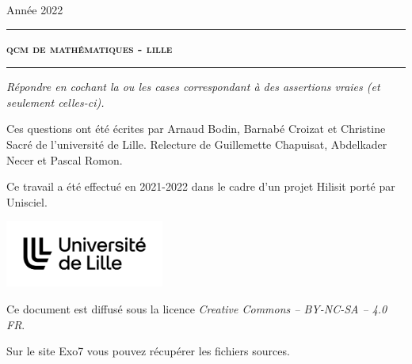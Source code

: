 \documentclass[11pt,a4paper]{article}
\begin{document}
 


\hfill{Année 2022}

\vspace*{0.5ex}
\hrule\vspace*{1.5ex} 
\hfil\textsc{\textbf{\LARGE qcm de mathématiques - lille}}
\vspace*{1.2ex} \hrule 
\vspace*{5ex} 


\vspace{4cm}

\begin{center}
\begin{minipage}{0.8\textwidth}
\center
\textit{Répondre en cochant la ou les cases correspondant à des assertions vraies (et seulement celles-ci).}
\end{minipage}
\end{center}
  
  


\vfill

\begin{center}
\begin{minipage}{0.8\textwidth}
\center
Ces questions ont été écrites par Arnaud Bodin, Barnabé Croizat et Christine Sacré de l'université de Lille. Relecture de Guillemette Chapuisat, Abdelkader Necer et Pascal Romon.
  
  \medskip
  
Ce travail a été effectué en 2021-2022 dans le cadre d'un projet Hilisit porté par Unisciel.
\end{minipage}

  \medskip

\qquad\qquad
\includegraphics[height=2.2cm]{logo-ulille}

  \medskip
  
Ce document est diffusé sous la licence \emph{Creative Commons -- BY-NC-SA -- 4.0 FR}.


Sur le site Exo7 vous pouvez récupérer les fichiers sources.

\end{center}


\newpage








\end{document}
